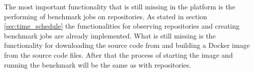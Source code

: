 The most important functionality that is still missing in the platform is the performing of benchmark jobs on \gh{} repositories.
As stated in section \ref{sec:time_schedule} the functionalities for observing \gh{} repositories and creating benchmark jobs are already implemented.
What is still missing is the functionality for downloading the source code from \gh{} and building a Docker image from the source code files.
After that the process of starting the image and running the benchmark will be the same as with \dockh{} repositories.





